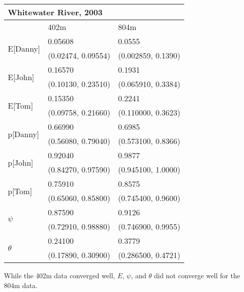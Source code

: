 \documentclass{article}
\begin{document}
    \begin{center}
    \begin{tabular}{|l|l|l|}
        \hline
        \multicolumn{3}{|l|}{\textbf{Whitewater River, 2003}} \\
        \hline
            & 402m & 804m \\
        \hline
        \multirow{2}{*}{E[Danny]}
            & 0.05608 & 0.0555 \\
            & (0.02474, 0.09554) & (0.002859, 0.1390) \\
        \hline
        \multirow{2}{*}{E[John]}
            & 0.16570 & 0.1931 \\
            & (0.10130, 0.23510) & (0.065910, 0.3384) \\
        \hline
        \multirow{2}{*}{E[Tom]}
            & 0.15350 & 0.2241 \\
            & (0.09758, 0.21660) & (0.110000, 0.3623) \\
        \hline
        \multirow{2}{*}{p[Danny]}
            & 0.66990 & 0.6985 \\
            & (0.56080, 0.79040) & (0.573100, 0.8366) \\
        \hline
        \multirow{2}{*}{p[John]}
            & 0.92040 & 0.9877 \\
            & (0.84270, 0.97590) & (0.945100, 1.0000) \\
        \hline
        \multirow{2}{*}{p[Tom]}
            & 0.75910 & 0.8575 \\
            & (0.65060, 0.85800) & (0.745400, 0.9600) \\
        \hline
        \multirow{2}{*}{\(\psi\)}
            & 0.87590 & 0.9126 \\
            & (0.72910, 0.98880) & (0.746900, 0.9955) \\
        \hline
        \multirow{2}{*}{\(\theta\)}
            & 0.24100 & 0.3779 \\
            & (0.17890, 0.30900) & (0.286500, 0.4721) \\
        \hline
    \end{tabular}
    \end{center}

    While the 402m data converged well, \(E\), \(\psi\), and \(\theta\) did not
    converge well for the 804m data.
\end{document}
